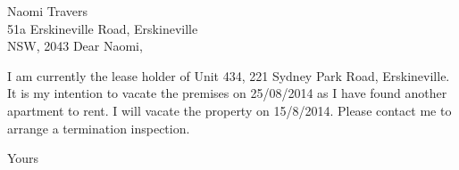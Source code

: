 \documentclass{letter}
\begin{document}
\begin{letter}{Naomi Travers \\ 51a Erskineville Road, Erskineville \\ NSW, 2043}
Dear Naomi,

I am currently the lease holder of Unit 434, 221 Sydney Park Road, Erskineville. 
It is my intention to vacate the premises on 25/08/2014 as I have found
another apartment to rent. I will vacate the property on 15/8/2014.
Please contact me to arrange a termination inspection.

\closing{Yours}

\end{letter}
\end{document}
